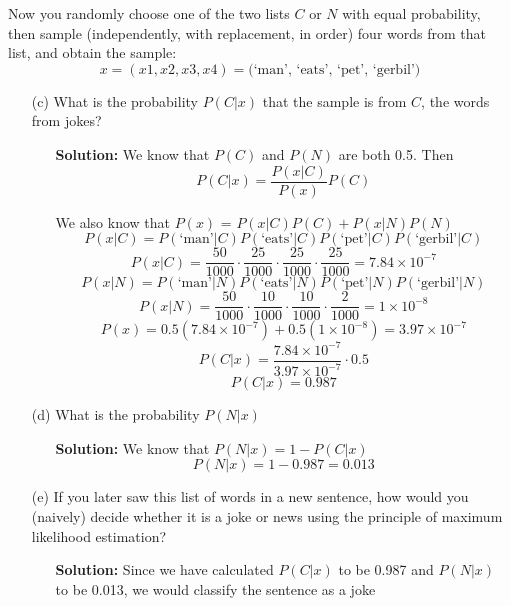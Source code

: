 \documentclass[hidelinks]{article}
\begin{document}
Now you randomly choose one of the two lists $C$ or $N$ with equal probability, then sample
(independently, with replacement, in order) four words from that list, and obtain the sample:
\[
    x = (x1, x2, x3, x4) = \text{(‘man’, ‘eats’, ‘pet’, ‘gerbil’)}
\]
\begin{itemize}
    \item[(c)] What is the probability $P(C|x)$ that the sample is from $C$, the words from jokes?
    \begin{itemize}
        \item[ ] \textbf{Solution:} We know that $P(C)$ and $P(N)$ are both 0.5. Then 
        \[
            P(C|x) = \frac{P(x|C)}{P(x)}P(C)
        \]
        \item[ ] We also know that $P(x)$ = $P(x|C)P(C) + P(x|N)P(N)$
        \[
            P(x|C) = P(\text{‘man’}|C)P(\text{‘eats’}|C)P(\text{‘pet’}|C)P(\text{‘gerbil’}|C) 
        \]
        \[
            P(x|C) = \frac{50}{1000}\cdot \frac{25}{1000}\cdot \frac{25}{1000}\cdot \frac{25}{1000} = 7.84\times 10^{-7}
        \]
        \[
            P(x|N) = P(\text{‘man’}|N)P(\text{‘eats’}|N)P(\text{‘pet’}|N)P(\text{‘gerbil’}|N) 
        \]
        \[
            P(x|N) = \frac{50}{1000}\cdot \frac{10}{1000}\cdot \frac{10}{1000}\cdot \frac{2}{1000} = 1\times 10^{-8}
        \]
        \[
            P(x) = 0.5(7.84\times 10^{-7}) + 0.5(1\times 10^{-8}) = 3.97 \times 10^{-7} 
        \]
        \[
            P(C|x) = \frac{7.84\times 10^{-7}}{3.97 \times 10^{-7}} \cdot 0.5 
        \]
        \[
            P(C|x) = 0.987
        \]
    \end{itemize}
    \item[(d)] What is the probability $P(N|x)$
    \begin{itemize}
        \item[ ]  \textbf{Solution:} We know that $P(N|x) = 1 - P(C|x)$
        \[
            P(N|x) = 1 - 0.987 = 0.013
        \]
    \end{itemize}
    \item[(e)] If you later saw this list of words in a new sentence, how would you (naively) decide whether it is a joke or news using the principle of maximum likelihood estimation? 
    \begin{itemize}
        \item[ ] \textbf{Solution:} Since we have calculated $P(C | x)$ to be 0.987 and $P(N | x)$ to be 0.013, we would classify the sentence as a joke 
    \end{itemize}
\end{itemize}
\newpage
\end{document}
